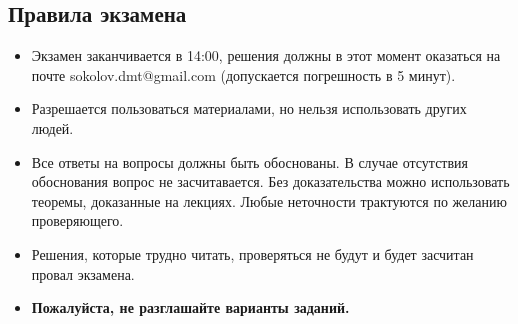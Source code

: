 \documentclass[a4paper, 12pt]{article}
\begin{document}

\renewcommand{\coursetitle}{\textsc{Ex}}


\subsection*{Правила экзамена}

\begin{itemize}
    \item Экзамен заканчивается в 14:00, решения должны в этот момент оказаться на почте
        sokolov.dmt@gmail.com (допускается погрешность в 5 минут).
    \item Разрешается пользоваться материалами, но нельзя использовать других людей.
    \item Все ответы на вопросы должны быть обоснованы. В случае отсутствия обоснования вопрос не
        засчитавается. Без доказательства можно использовать теоремы, доказанные на лекциях. Любые
        неточности трактуются по желанию проверяющего.
    \item Решения, которые трудно читать, проверяться не будут и будет засчитан провал экзамена.
    \item \textbf{Пожалуйста, не разглашайте варианты заданий.}
\end{itemize}

\vspace{1cm}
\end{document}
